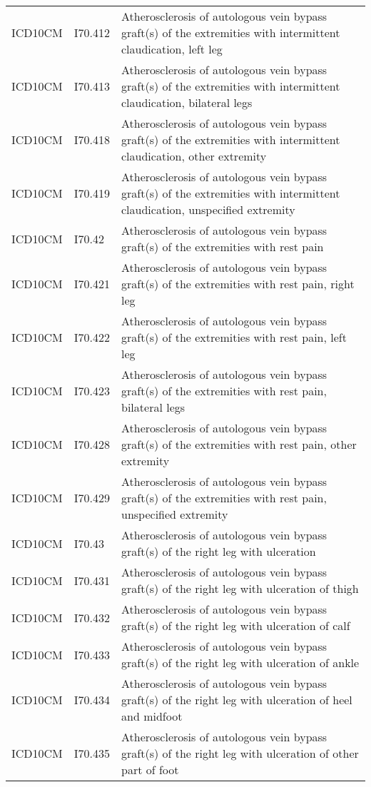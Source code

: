 \begin{longtable}{p{}p{}p{}}
  ICD10CM & I70.412 & Atherosclerosis of autologous vein bypass graft(s) of the extremities with intermittent claudication, left leg \\ 
  ICD10CM & I70.413 & Atherosclerosis of autologous vein bypass graft(s) of the extremities with intermittent claudication, bilateral legs \\ 
  ICD10CM & I70.418 & Atherosclerosis of autologous vein bypass graft(s) of the extremities with intermittent claudication, other extremity \\ 
  ICD10CM & I70.419 & Atherosclerosis of autologous vein bypass graft(s) of the extremities with intermittent claudication, unspecified extremity \\ 
  ICD10CM & I70.42 & Atherosclerosis of autologous vein bypass graft(s) of the extremities with rest pain \\ 
  ICD10CM & I70.421 & Atherosclerosis of autologous vein bypass graft(s) of the extremities with rest pain, right leg \\ 
  ICD10CM & I70.422 & Atherosclerosis of autologous vein bypass graft(s) of the extremities with rest pain, left leg \\ 
  ICD10CM & I70.423 & Atherosclerosis of autologous vein bypass graft(s) of the extremities with rest pain, bilateral legs \\ 
  ICD10CM & I70.428 & Atherosclerosis of autologous vein bypass graft(s) of the extremities with rest pain, other extremity \\ 
  ICD10CM & I70.429 & Atherosclerosis of autologous vein bypass graft(s) of the extremities with rest pain, unspecified extremity \\ 
  ICD10CM & I70.43 & Atherosclerosis of autologous vein bypass graft(s) of the right leg with ulceration \\ 
  ICD10CM & I70.431 & Atherosclerosis of autologous vein bypass graft(s) of the right leg with ulceration of thigh \\ 
  ICD10CM & I70.432 & Atherosclerosis of autologous vein bypass graft(s) of the right leg with ulceration of calf \\ 
  ICD10CM & I70.433 & Atherosclerosis of autologous vein bypass graft(s) of the right leg with ulceration of ankle \\ 
  ICD10CM & I70.434 & Atherosclerosis of autologous vein bypass graft(s) of the right leg with ulceration of heel and midfoot \\ 
  ICD10CM & I70.435 & Atherosclerosis of autologous vein bypass graft(s) of the right leg with ulceration of other part of foot \\ 

\end{longtable}
